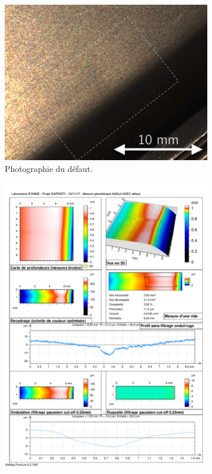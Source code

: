 \begin{figure}[btp]
	\centering
	\begin{subfigure}[c]{0.48\textwidth}
		\centering
		\includegraphics[width=\textwidth]{../Chap2/Figures/Cam1_Image_22_PO_defect_AVEC.jpg}
		\caption{Photographie du défaut.}
	\end{subfigure}
	\begin{subfigure}[c]{0.48\textwidth}
		\centering
		\includegraphics[width=\textwidth]{../Chap2/Figures/altisurf_defect.pdf}

\end{subfigure}
\end{figure}
